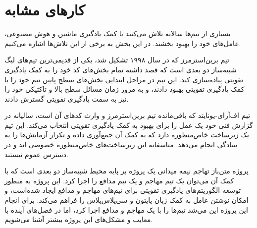 \section{کار‌های مشابه}
بسیاری از تیم‌ها سالانه تلاش می‌کنند با کمک یادگیری ماشین
 و هوش مصنوعی، عامل‌های خود را بهبود بخشند.
در این بخش به برخی از این تلاش‌ها اشاره می‌کنیم.

تیم برین‌استرمرز
که در سال ۱۹۹۸ تشکیل شد، یکی از قدیمی‌ترین تیم‌های لیگ شبیه‌ساز دو بعدی است که قصد داشته تمام بخش‌های کد خود را به کمک یادگیری تقویتی پیاده‌سازی کند.
این تیم در مراحل ابتدایی بخش‌های سطح پایین تیم خود را با کمک یادگیری تقویتی بهبود دادند، و به مرور زمان مسائل سطح بالا و تاکتیکی خود را نیز به سمت یادگیری تقویتی گسترش دادند\cite{riedmiller2001karlsruhe,riedmiller2005brainstormers}.

تیم اف‌آر‌ای-یونایتد
که باقی‌مانده تیم برین‌استرمرز و وارث کد‌های آن است، سالیانه در گزارش فنی خود یک عمل را برای بهبود به کمک یادگیری تقویتی انتخاب می‌کند\cite{gabel2019fra}.
این تیم یک زیرساخت خاص‌منظوره دارد که به کمک آن جمع‌آوری داده و تکرار آزمایش‌ها را به سادگی انجام می‌دهد.
متاسفانه این زیرساخت‌های خاص‌منظوره خصوصی اند و در دسترس عموم نیستند.

پروژه متن‌باز
تهاجم نیمه میدانی
یک پروژه بر پایه محیط شبیه‌ساز دو بعدی است که با کمک آن می‌توان یک تیم مهاجم و یک تیم مدافع را اجرا کرد\cite{kalyanakrishnan2007half,hausknecht2016half}.
این پروژه به منظور توسعه الگوریتم‌های یادگیری تقویتی برای تیم‌های مهاجم و مدافع ایجاد شده‌است، و امکان نوشتن عامل به کمک زبان پایتون
 و سی‌پلاس‌پلاس
را فراهم می‌کند.
برای انجام این پروژه این می‌شد تیم‌ها را با یک مهاجم و مدافع اجرا کرد، اما در فصل‌های آینده با معایب و مشکل‌های این پروژه بیشتر آشنا می‌شویم.
